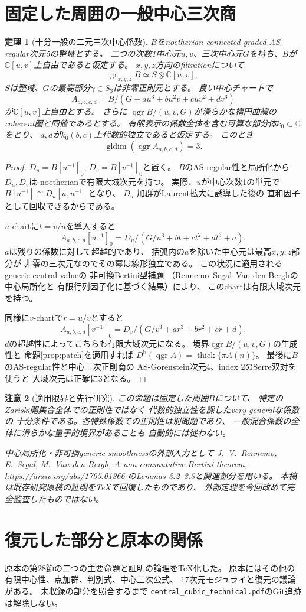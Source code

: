 \documentclass[a4paper,11pt]{ltjsarticle}
\newtheorem{theorem}{定理}[section]
\newtheorem{remark}[theorem]{注意}
\newcommand{\qgr}{\operatorname{qgr}}
\newcommand{\gldim}{\operatorname{gldim}}
\newcommand{\thick}{\operatorname{thick}}
\newcommand{\Db}{D^{\mathrm b}}
\begin{document}
\section{固定した周囲の一般中心三次商}
\begin{theorem}[十分一般の二元三次中心係数]\label{thm:generic}
$B$をnoetherian connected graded AS-regular次元5の整域とする。
二つの次数1中心元$u,v$、三次中心元$G$を持ち、$B$が
$\mathbb C[u,v]$上自由であると仮定する。
$x,y,z$方向のfiltrationについて
\[
\operatorname{gr}_{x,y,z}B
\simeq S\otimes\mathbb C[u,v],
\]
$S$は整域、$G$の最高部分$\gamma\in S_3$は非零正則元とする。
良い中心チャートで
\[
A_{a,b,c,d}
=B/(G+au^3+bu^2v+cuv^2+dv^3)
\]
が$\mathbb C[u,v]$上自由とする。
さらに
$\qgr B/(u,v,G)$が滑らかな楕円曲線のcoherent圏と同値であるとする。
有限表示の係数全体を含む可算な部分体$k_0\subset\mathbb C$をとり、
$a,d$が$k_0(b,c)$上代数的独立であると仮定する。
このとき
\[
\gldim(\qgr A_{a,b,c,d})=3.
\]
\end{theorem}
\begin{proof}
$D_u=B[u^{-1}]_0$, $D_v=B[v^{-1}]_0$と置く。
$B$のAS-regular性と局所化から$D_u,D_v$は
noetherianで有限大域次元を持つ。
実際、$u$が中心次数1の単元で
$B[u^{-1}]\cong D_u[u,u^{-1}]$となり、
$D_u$-加群がLaurent拡大に誘導した後の
直和因子として回収できるからである。

$u$-chartに$t=v/u$を導入すると
\[
A_{a,b,c,d}[u^{-1}]_0
=D_u/(G/u^3+bt+ct^2+dt^3+a).
\]
$a$は残りの係数に対して超越的であり、
括弧内の$a$を除いた中心元は最高$x,y,z$部分が
非零の三次元なのでその冪は線形独立である。
この状況に適用されるgeneric central valueの
非可換Bertini型補題
（Rennemo--Segal--Van den Berghの中心局所化と
有限行列因子化に基づく結果）により、
このchartは有限大域次元を持つ。

同様に$v$-chartで$r=u/v$とすると
\[
A_{a,b,c,d}[v^{-1}]_0
=D_v/(G/v^3+ar^3+br^2+cr+d).
\]
$d$の超越性によってこちらも有限大域次元になる。
境界$\qgr B/(u,v,G)$の生成性と
命題\ref{prop:patch}を適用すれば
$\Db(\qgr A)=\thick\{\pi A(n)\}$。
最後に$B$のAS-regular性と中心三次正則商の
AS-Gorenstein次元4、index 2のSerre双対を使うと
大域次元は正確に3となる。
\end{proof}

\begin{remark}[適用限界と先行研究]
この命題は固定した周囲$B$について、
特定のZariski開集合全体での正則性ではなく
代数的独立性を課したvery-generalな係数の
十分条件である。各特殊係数での正則性は別問題であり、
一般混合係数の全体に滑らかな量子的境界があることも
自動的には従わない。

中心局所化・非可換generic smoothnessの外部入力として
J.~V.~Rennemo, E.~Segal, M.~Van den Bergh,
\emph{A non-commutative Bertini theorem},
\url{https://arxiv.org/abs/1705.01366}
のLemmas 3.2--3.3と関連部分を用いる。
本稿は既存研究原稿の証明をTeXで回復したものであり、
外部定理を今回改めて完全監査したものではない。
\end{remark}

\section{復元した部分と原本の関係}
原本の第28節の二つの主要命題と証明の論理をTeX化した。
原本にはその他の有限中心性、点加群、判別式、中心三次公式、
17次元モジュライと復元の議論がある。
未収録の部分を照合するまで
\texttt{central\_cubic\_technical.pdf}のGit追跡は解除しない。
\end{document}
